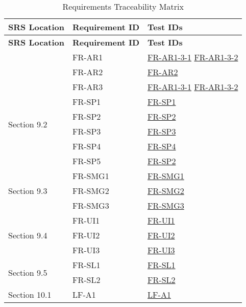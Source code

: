 \documentclass[12pt, titlepage]{article}
\begin{document}
\begin{longtable}{|p{3cm}|p{4cm}|p{4cm}|}
  \caption{Requirements Traceability Matrix} \\
  \hline
  \textbf{SRS Location} & \textbf{Requirement ID} & \textbf{Test IDs} \\
  \hline
  \endfirsthead

  \hline
  \textbf{SRS Location} & \textbf{Requirement ID} & \textbf{Test IDs} \\
  \hline
  \endhead

  \hline
  \endfoot

  \hline
  \endlastfoot

  \multirow{3}{3cm}{Section 9.1} & FR-AR1 & \hyperref[FR-AR]{FR-AR1-3-1} \newline \hyperref[FR-AR]{FR-AR1-3-2} \\
  \cline{2-3}
  & FR-AR2 & \hyperref[FR-AR]{FR-AR2} \\
  \cline{2-3}
  & FR-AR3 & \hyperref[FR-AR]{FR-AR1-3-1} \newline \hyperref[FR-AR]{FR-AR1-3-2} \\
  \hline
  \multirow{4}{3cm}{Section 9.2} & FR-SP1 & \hyperref[FR-SP]{FR-SP1} \\
  \cline{2-3}
  & FR-SP2 & \hyperref[FR-SP]{FR-SP2} \\
  \cline{2-3}
  & FR-SP3 & \hyperref[FR-SP]{FR-SP3} \\
  \cline{2-3}
  & FR-SP4 & \hyperref[FR-SP]{FR-SP4} \\
  \cline{2-3}
  & FR-SP5 & \hyperref[FR-SP]{FR-SP2} \\
  \hline
  \multirow{3}{3cm}{Section 9.3} & FR-SMG1 & \hyperref[FR-SMG]{FR-SMG1} \\
  \cline{2-3}
  & FR-SMG2 & \hyperref[FR-SMG]{FR-SMG2} \\
  \cline{2-3}
  & FR-SMG3 & \hyperref[FR-SMG]{FR-SMG3} \\
  \hline
  \multirow{3}{3cm}{Section 9.4} & FR-UI1 & \hyperref[FR-UI]{FR-UI1} \\
  \cline{2-3}
  & FR-UI2 & \hyperref[FR-UI]{FR-UI2} \\
  \cline{2-3}
  & FR-UI3 & \hyperref[FR-UI]{FR-UI3} \\
  \hline
  \multirow{2}{3cm}{Section 9.5} & FR-SL1 & \hyperref[FR-SL]{FR-SL1} \\
  \cline{2-3}
  & FR-SL2 & \hyperref[FR-SL]{FR-SL2} \\
  \hline
  \multirow{3}{3cm}{Section 10.1} 
  & LF-A1 & \hyperref[LF]{LF-A1} \\

\end{longtable}
\end{document}
